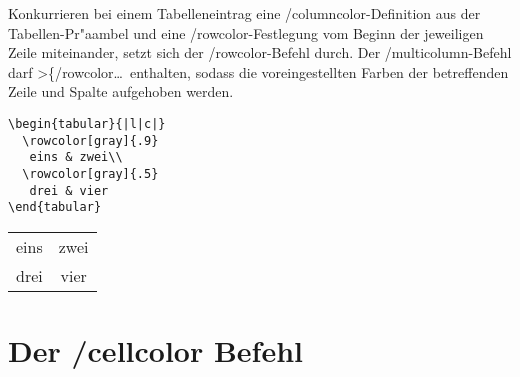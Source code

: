 \documentclass[ngerman]{article}
\begin{document}
Konkurrieren bei einem Tabelleneintrag eine \slash \textsf{columncolor}-Definition aus der
Tabellen-Pr"aambel und eine \slash \textsf{rowcolor}-Festlegung vom Beginn der jeweiligen 
Zeile miteinander, setzt sich der \slash \textsf{rowcolor}-Befehl durch. Der 
\slash \textsf{multicolumn}-Befehl darf >\{\slash \textsf{rowcolor}\ldots\ enthalten, 
sodass die voreingestellten Farben der betreffenden Zeile und Spalte aufgehoben werden.
\begin{center}
\begin{minipage}{.75\textwidth}
\begin{verbatim}
\begin{tabular}{|l|c|}
  \rowcolor[gray]{.9}
   eins & zwei\\
  \rowcolor[gray]{.5}
   drei & vier
\end{tabular}
\end{verbatim}
\end{minipage}
 {\bfseries
  \begin{tabular}{|l|c|}
  \rowcolor[gray]{.9}
  eins & zwei\\
  \rowcolor[gray]{.5}
  drei & vier
  \end{tabular}}
 \end{center}

 \section{Der \slash \textsf{cellcolor} Befehl}
\end{document}
